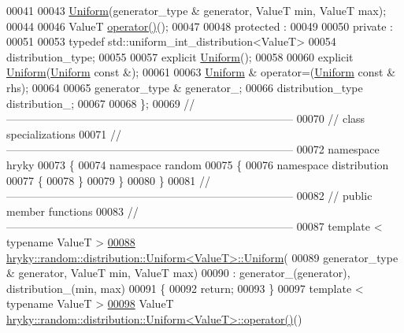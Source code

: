 \begin{DoxyCode}
00041 
00043     \hyperlink{classhryky_1_1random_1_1distribution_1_1_uniform}{Uniform}(generator\_type & generator, ValueT min, ValueT max);
00044 
00046     ValueT \hyperlink{classhryky_1_1random_1_1distribution_1_1_uniform_aa2748e4d5b6c9ac9881d58e0da0c181f}{operator()}();
00047 
00048 \textcolor{keyword}{protected} :
00049 
00050 \textcolor{keyword}{private} :
00051 
00053     \textcolor{keyword}{typedef} std::uniform\_int\_distribution<ValueT>
00054         distribution\_type;
00055 
00057     \textcolor{keyword}{explicit} \hyperlink{classhryky_1_1random_1_1distribution_1_1_uniform}{Uniform}();
00058 
00060     \textcolor{keyword}{explicit} \hyperlink{classhryky_1_1random_1_1distribution_1_1_uniform}{Uniform}(\hyperlink{classhryky_1_1random_1_1distribution_1_1_uniform}{Uniform} \textcolor{keyword}{const} &);
00061 
00063     \hyperlink{classhryky_1_1random_1_1distribution_1_1_uniform}{Uniform} & operator=(\hyperlink{classhryky_1_1random_1_1distribution_1_1_uniform}{Uniform} \textcolor{keyword}{const} & rhs);
00064 
00065     generator\_type &    generator\_;
00066     distribution\_type   distribution\_;
00067 
00068 \};
00069 \textcolor{comment}{//
      ------------------------------------------------------------------------------}
00070 \textcolor{comment}{// class specializations}
00071 \textcolor{comment}{//
      ------------------------------------------------------------------------------}
00072 \textcolor{keyword}{namespace }hryky
00073 \{
00074 \textcolor{keyword}{namespace }random
00075 \{
00076 \textcolor{keyword}{namespace }distribution
00077 \{
00078 \}
00079 \}
00080 \}
00081 \textcolor{comment}{//
      ------------------------------------------------------------------------------}
00082 \textcolor{comment}{// public member functions}
00083 \textcolor{comment}{//
      ------------------------------------------------------------------------------}
00087 \textcolor{comment}{}\textcolor{keyword}{template} < \textcolor{keyword}{typename} ValueT >
\hypertarget{random__distribution__uniform_8h_source_l00088}{}\hyperlink{classhryky_1_1random_1_1distribution_1_1_uniform_a53d0304612f476e02199887d5fec290c}{00088} \hyperlink{classhryky_1_1random_1_1distribution_1_1_uniform}{hryky::random::distribution::Uniform<ValueT>::Uniform}(
00089     generator\_type & generator, ValueT min, ValueT max)
00090     : generator\_(generator), distribution\_(min, max)
00091 \{
00092     \textcolor{keywordflow}{return};
00093 \}
00097 \textcolor{keyword}{template} < \textcolor{keyword}{typename} ValueT >
\hypertarget{random__distribution__uniform_8h_source_l00098}{}\hyperlink{classhryky_1_1random_1_1distribution_1_1_uniform_aa2748e4d5b6c9ac9881d58e0da0c181f}{00098} ValueT \hyperlink{classhryky_1_1random_1_1distribution_1_1_uniform}{hryky::random::distribution::Uniform<ValueT>::operator()}()

\end{DoxyCode}
